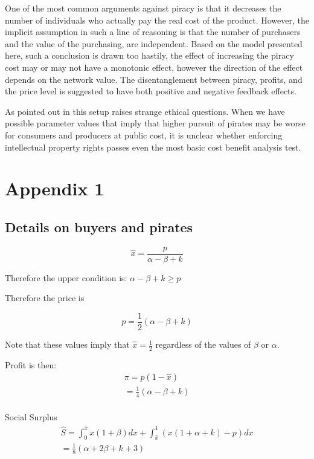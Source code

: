 \documentclass[11pt]{article}
\begin{document}
One of the most common arguments against piracy is that it decreases the number of individuals who actually pay the real cost of the product.  However, the implicit assumption in such a line of reasoning is that the number of purchasers and the value of the purchasing, are independent. Based on the model presented here, such a conclusion is drawn too hastily, the effect of increasing the piracy cost may or may not have a monotonic effect, however the direction of the effect depends on the network value. The disentanglement between piracy, profits, and the price level is suggested to have both positive and negative feedback effects.

As pointed out in \cite{CRP91} this setup raises strange ethical questions. When we have possible parameter values that imply that higher pursuit of pirates may be worse for consumers and producers at public cost, it is unclear whether enforcing intellectual property rights passes even the most basic cost benefit analysis test.

\newpage

\section{Appendix 1}

\subsection{Details on buyers and pirates}

\begin{equation*}
\hat{x} = \frac{p}{\alpha-\beta + k}
\end{equation*}

Therefore the upper condition is: $\alpha-\beta+k \geq p$

Therefore the price is

\begin{equation*}
p = \frac{1}{2}\left(
\alpha-\beta+k
\right)
\end{equation*}

Note that these values imply that $\hat{x} = \frac{1}{2}$ regardless of the values of $\beta$ or $\alpha$.

Profit is then:
\begin{align*}
\pi = p(1-\hat{x}) \\
=  \frac{1}{4}\left(
\alpha-\beta+k
\right)  \\
\end{align*}

Social Surplus
\begin{align*}
\hat{S} = \int_0^{\hat{x}}x(1+\beta)dx+
\int_{\hat{x}}^{1}\left( x(1+\alpha+k)-p \right)dx \\
= \frac{1}{8} (\alpha+2 \beta+k+3) \\
\end{align*}
\end{document}
